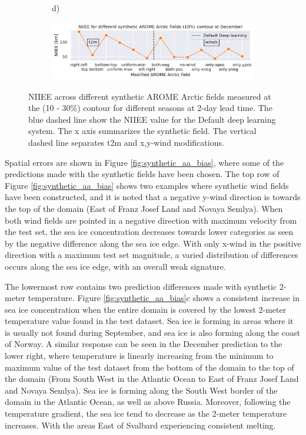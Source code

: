 \documentclass[../main/thesis.tex]{subfiles}
\begin{document}
\begin{figure}
\begin{subfigure}[t]{0.975\textwidth}
    \end{subfigure}
    \begin{subfigure}[t]{.015\textwidth}
        d)
    \end{subfigure}
    \begin{subfigure}[t]{0.975\textwidth}
        \includegraphics[width=\textwidth, valign = t]{NIIEE_12.pdf}
    \end{subfigure}
    \caption{\label{fig:synthetic_aa_niiee}NIIEE across different synthetic AROME Arctic fields measured at the (10 - 30\%) contour for different seasons at 2-day lead time. The blue dashed line show the NIIEE value for the Default deep learning system. The x axis summarizes the synthetic field. The vertical dashed line separates t2m and x,y-wind modifications.}
\end{figure}

Spatial errors are shown in Figure \ref{fig:synthetic_aa_bias}, where some of the predictions made with the synthetic fields have been chosen. The top row of Figure \ref{fig:synthetic_aa_bias} shows two examples where synthetic wind fields have been constructed, and it is noted that a negative y-wind direction is towards the top of the domain (East of Franz Josef Land and Novaya Semlya). When both wind fields are pointed in a negative direction with maximum velocity from the test set, the sea ice concentration decreases towards lower categories as seen by the negative difference along the sea ice edge. With only x-wind in the positive direction with a maximum test set magnitude, a varied distribution of differences occurs along the sea ice edge, with an overall weak signature.

The lowermost row contains two prediction differences made with synthetic 2-meter temperature. Figure \ref{fig:synthetic_aa_bias}c shows a consistent increase in sea ice concentration when the entire domain is covered by the lowest 2-meter temperature value found in the test dataset. Sea ice is forming in areas where it is usually not found during September, and sea ice is also forming along the coast of Norway. A similar response can be seen in the December prediction to the lower right, where temperature is linearly increasing from the minimum to maximum value of the test dataset from the bottom of the domain to the top of the domain (From South West in the Atlantic Ocean to East of Franz Josef Land and Novaya Semlya). Sea ice is forming along the South West border of the domain in the Atlantic Ocean, as well as above Russia. Moreover, following the temperature gradient, the sea ice tend to decrease as the 2-meter temperature increases. With the areas East of Svalbard experiencing consistent melting.
\end{document}
